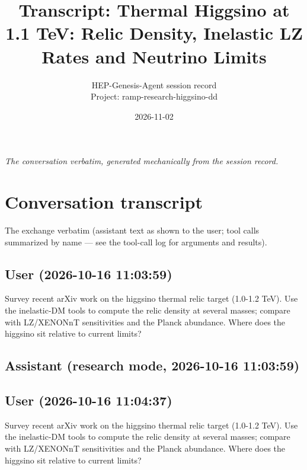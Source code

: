 \documentclass[11pt,a4paper]{article}
\title{Transcript: Thermal Higgsino at 1.1 TeV: Relic Density, Inelastic LZ Rates and Neutrino Limits}
\author{HEP-Genesis-Agent session record \\ \small Project: ramp-research-higgsino-dd}
\date{2026-11-02}
\begin{document}
\maketitle
\noindent\textit{\small The conversation verbatim, generated mechanically from the session record.}
\vspace{1em}



\appendix
\section{Conversation transcript}
\label{app:transcript}
The exchange verbatim (assistant text as shown to the user; tool calls summarized by name --- see the tool-call log for arguments and results).
\subsection*{User \small(2026-10-16 11:03:59)}
Survey recent arXiv work on the higgsino thermal relic target (1.0-1.2 TeV). Use the inelastic-DM tools to compute the relic density at several masses; compare with LZ/XENONnT sensitivities and the Planck abundance. Where does the higgsino sit relative to current limits?

\subsection*{Assistant \small(research mode, 2026-10-16 11:03:59)}
\subsection*{User \small(2026-10-16 11:04:37)}
Survey recent arXiv work on the higgsino thermal relic target (1.0-1.2 TeV). Use the inelastic-DM tools to compute the relic density at several masses; compare with LZ/XENONnT sensitivities and the Planck abundance. Where does the higgsino sit relative to current limits?
\end{document}
